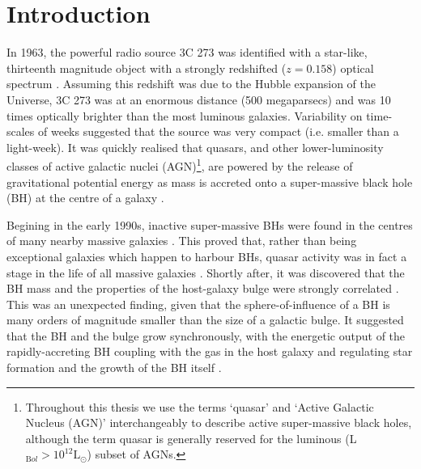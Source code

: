 
\chapter{Introduction}
\label{ch:intro}

In 1963, the powerful radio source 3C 273 was identified with a star-like, thirteenth magnitude object with a strongly redshifted ($z=0.158$)  optical spectrum \citep{schmidt63}. 
Assuming this redshift was due to the Hubble expansion of the Universe, 3C 273 was at an enormous distance (500 megaparsecs) and was 10 times optically brighter than the most luminous galaxies. 
Variability on time-scales of weeks suggested that the source was very compact (i.e. smaller than a light-week).
It was quickly realised that quasars, and other lower-luminosity classes of active galactic nuclei (AGN)\footnote{Throughout this thesis we use the terms `quasar' and `Active Galactic Nucleus (AGN)' interchangeably to describe active super-massive black holes, although the term quasar is generally reserved for the luminous (L$_{\mathrm Bol} > 10^{12}{\mathrm L}_{\odot}$) subset of AGNs.}, are powered by the release of gravitational potential energy as mass is accreted onto a super-massive  black hole (BH) at the centre of a galaxy \citep[e.g.][]{hoyle63,salpeter64,lynden-bell69,lynden-bell71}. 

Begining in the early 1990s, inactive super-massive BHs were found in the centres of many nearby massive galaxies \citep[e.g.][]{kormendy95,ferrarese05,kormendy13}.
This proved that, rather than being exceptional galaxies which happen to harbour BHs, quasar activity was in fact a stage in the life of all massive galaxies \citep[e.g.][]{lynden-bell69}. 
Shortly after, it was discovered that the BH mass and the properties of the host-galaxy bulge were strongly correlated \citep[e.g. the M$_{\mathrm BH}$-$\sigma$ relation][]{ferrarese00,gebhardt00,graham01,tremaine02,marconi03,aller07,gultekin09}. 
This was an unexpected finding, given that the sphere-of-influence  of a BH is many orders of magnitude smaller than the size of a galactic bulge. 
It suggested that the BH and the bulge grow synchronously, with the energetic output of the rapidly-accreting BH coupling with the gas in the host galaxy and regulating star formation and the growth of the BH itself \citep[e.g.][]{silk98,king03,dimatteo05,king15}. 

